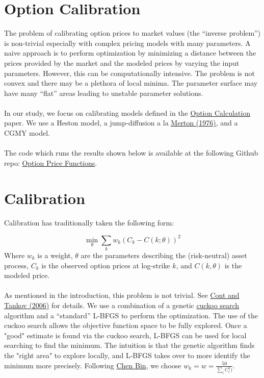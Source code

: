\documentclass{article}
\begin{document}

\section{Option Calibration}
\setlength{\parindent}{0cm}

The problem of calibrating option prices to market values (the ``inverse problem'') is non-trivial especially with complex pricing models with many parameters.  A naive approach is to perform optimization by minimizing a distance between the prices provided by the market and the modeled prices by varying the input parameters.  However, this can be computationally intensive.  The problem is not convex and there may be a plethora of local minima. The parameter surface may have many ``flat'' areas leading to unstable parameter solutions.  
\\
\\
In our study, we focus on calibrating models defined in the \href{https://github.com/realoptions/option_price_faas/tree/master/techdoc}{Option Calculation} paper.  We use a Heston model, a jump-diffusion a la \href{http://www.people.hbs.edu/rmerton/optionpricingwhenunderlingstock.pdf}{Merton (1976)}, and a CGMY model.  
\\
\\
The code which runs the results shown below is available at the following Github repo: \href{https://github.com/realoptions/option_price_faas}{Option Price Functions}.  

\section{Calibration}

Calibration has traditionally taken the following form:

\[\min_\theta \sum_k w_k \left(C_k-C(k; \theta)\right)^2 \]
Where \(w_k\) is a weight, \(\theta\) are the parameters describing the (risk-neutral) asset process, \(C_k\) is the observed option prices at log-strike \(k\), and \(C(k, \theta)\) is the modeled price.  
\\
\\
As mentioned in the introduction, this problem is not trivial.  See \href{http://citeseerx.ist.psu.edu/viewdoc/download;jsessionid=E58EF2375731921D342B8965E1AA18C9?doi=10.1.1.155.662&rep=rep1&type=pdf}{Cont and Tankov (2006)} for details.  We use a combination of a genetic \href{https://www.cs.tufts.edu/comp/150GA/homeworks/hw3/_reading7\%20Cuckoo\%20search.pdf}{cuckoo search} algorithm and a ``standard'' L-BFGS to perform the optimization.  The use of the cuckoo search allows the objective function space to be fully explored.  Once a "good" estimate is found via the cuckoo search, L-BFGS can be used for local searching to find the minimum.  The intuition is that the genetic algorithm finds the "right area" to explore locally, and L-BFGS takes over to more identify the minimum more precisely.  Following \href{https://citeseerx.ist.psu.edu/viewdoc/download?doi=10.1.1.377.2222&rep=rep1&type=pdf}{Chen Bin}, we choose \(w_k=w=\frac{50}{\sum_i C_i^2)}\).  
\end{document}
